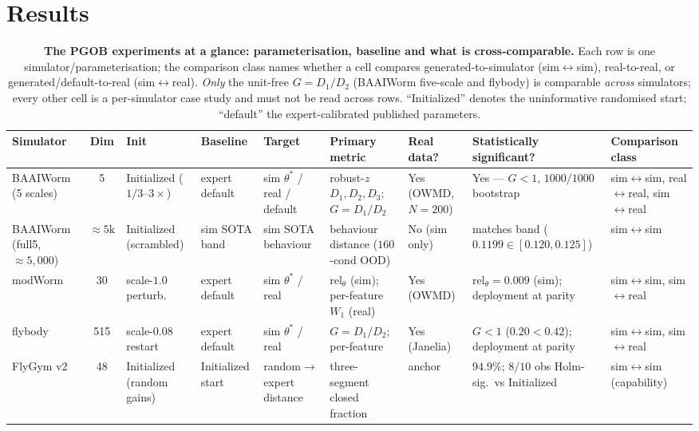 \documentclass[11pt]{article}
\begin{document}
\section*{Results}

\begin{table}
\centering\footnotesize
\caption{\textbf{The PGOB experiments at a glance: parameterisation, baseline and what is cross-comparable.} Each row is one simulator/parameterisation; the comparison class names whether a cell compares generated-to-simulator (sim$\leftrightarrow$sim), real-to-real, or generated/default-to-real (sim$\leftrightarrow$real). \emph{Only} the unit-free $G{=}D_1/D_2$ (BAAIWorm five-scale and flybody) is comparable \emph{across} simulators; every other cell is a per-simulator case study and must not be read across rows. ``Initialized'' denotes the uninformative randomised start; ``default'' the expert-calibrated published parameters.}
\label{tab:claimmap}
\begin{tabular}{p{2.5cm}cp{1.5cm}p{2.3cm}p{2.1cm}p{2.6cm}p{1.7cm}p{3.0cm}p{2.6cm}}\toprule
Simulator & Dim & Init & Baseline & Target & Primary metric & Real data? & Statistically significant? & Comparison class \\\midrule
BAAIWorm (5 scales) & 5 & Initialized ($1/3$--$3\times$) & expert default & sim $\theta^*$ / real / default & robust-$z$ $D_1,D_2,D_3$; $G{=}D_1/D_2$ & Yes (OWMD, $N{=}200$) & Yes --- $G{<}1$, $1000/1000$ bootstrap & sim$\leftrightarrow$sim, real$\leftrightarrow$real, sim$\leftrightarrow$real \\[2pt]
BAAIWorm (full5, ${\approx}5{,}000$) & ${\approx}5\mathrm{k}$ & Initialized (scrambled) & sim SOTA band & sim SOTA behaviour & behaviour distance ($160$-cond OOD) & No (sim only) & matches band ($0.1199\in[0.120,0.125]$) & sim$\leftrightarrow$sim \\[2pt]
modWorm & 30 & scale-$1.0$ perturb. & expert default & sim $\theta^*$ / real & $\mathrm{rel}_\theta$ (sim); per-feature $W_1$ (real) & Yes (OWMD) & $\mathrm{rel}_\theta{=}0.009$ (sim); deployment at parity & sim$\leftrightarrow$sim, sim$\leftrightarrow$real \\[2pt]
flybody & 515 & scale-$0.08$ restart & expert default & sim $\theta^*$ / real & $G{=}D_1/D_2$; per-feature & Yes (Janelia) & $G{<}1$ ($0.20{<}0.42$); deployment at parity & sim$\leftrightarrow$sim, sim$\leftrightarrow$real \\[2pt]
FlyGym v2 & 48 & Initialized (random gains) & Initialized start & random$\to$expert distance & three-segment closed fraction & anchor & $94.9\%$; $8/10$ obs Holm-sig.\ vs Initialized & sim$\leftrightarrow$sim (capability) \\\bottomrule
\end{tabular}
\end{table}
\end{document}
